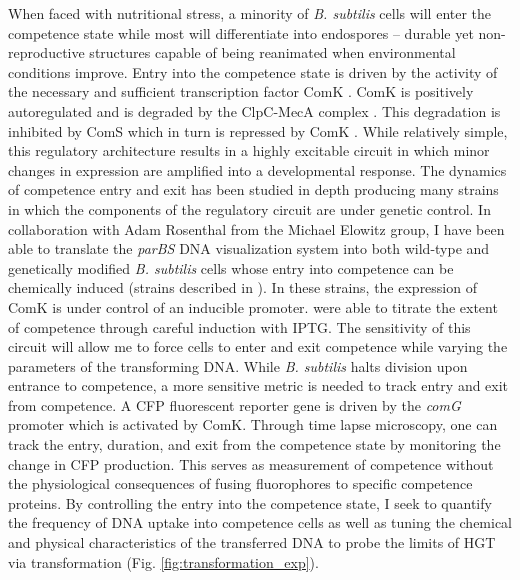 When faced with nutritional stress, a minority of \textit{B. subtilis} cells
will enter the competence state while most will differentiate into endospores --
durable yet non-reproductive structures capable of being reanimated when
environmental conditions improve. Entry into the competence state is driven by
the activity of the necessary and sufficient transcription factor ComK
\cite{Berka:2002uf}. ComK is positively autoregulated and is degraded by the
ClpC-MecA complex \cite{Smits:2005jw}. This degradation is inhibited by ComS
which in turn is repressed by ComK \cite{Ogura:1999wb}. While relatively simple,
this regulatory architecture results in a highly excitable circuit in which
minor changes in expression are amplified into a developmental response. The
dynamics of competence entry and exit has been studied in depth
\cite{Suel:2007dm, Suel:2006ea, Cagatay:2009ie} producing many strains in which
the components of the regulatory circuit are under genetic control. In
collaboration with Adam Rosenthal from the Michael Elowitz group, I have been
able to translate the \textit{parBS} DNA visualization system into both
wild-type and genetically modified \textit{B. subtilis} cells whose entry into
competence can be chemically induced (strains described in
\citet{Suel:2007dm}). In these strains, the expression of ComK is under control
of an inducible promoter. \citet{Suel:2007dm} were able to titrate the extent of
competence through careful induction with IPTG. The sensitivity of this circuit
will allow me to force cells to enter and exit competence while varying the
parameters of the transforming DNA. While \textit{B. subtilis} halts division
upon entrance to competence, a more sensitive metric is needed to track entry
and exit from competence. A CFP fluorescent reporter gene is driven by the
\textit{comG} promoter which is activated by ComK. Through time lapse
microscopy, one can track the entry, duration, and exit from the competence state
by monitoring the change in CFP production. This serves as measurement of
competence without the physiological consequences of fusing fluorophores to
specific competence proteins.  By controlling the entry into the competence
state, I seek to quantify the frequency of DNA uptake into competence cells as
well as tuning the chemical and physical characteristics of the transferred DNA
to probe the limits of HGT via transformation (Fig.
\ref{fig:transformation_exp}). 


